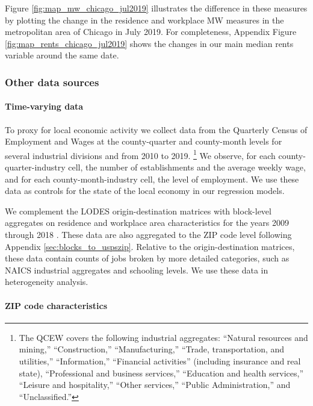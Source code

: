 Figure \ref{fig:map_mw_chicago_jul2019} illustrates the difference in these 
measures by plotting the change in the residence and workplace MW measures 
in the metropolitan area of Chicago in July 2019.
For completeness, Appendix Figure \ref{fig:map_rents_chicago_jul2019} shows
the changes in our main median rents variable around the same date.


\subsubsection{Other data sources}\label{sec:data_other}

\paragraph{Time-varying data}

To proxy for local economic activity we collect data from the 
Quarterly Census of Employment and Wages \parencite[QCEW;][]{QCEW} 
at the county-quarter and county-month levels for several industrial divisions 
and from 2010 to 2019.%
\footnote{The QCEW covers the following industrial aggregates: 
``Natural resources and mining,'' ``Construction,'' ``Manufacturing,'' 
``Trade, transportation, and utilities,'' ``Information,'' 
``Financial activities'' (including insurance and real state), 
``Professional and business services,'' ``Education and health services,'' 
``Leisure and hospitality,'' ``Other services,'' ``Public Administration,''
and ``Unclassified.''}
We observe, for each county-quarter-industry cell, the number of establishments 
and the average weekly wage, and 
for each county-month-industry cell, the level of employment.
We use these data as controls for the state of the local economy in our 
regression models.

We complement the LODES origin-destination matrices with block-level aggregates 
on residence and workplace area characteristics for the years 2009 through 2018 
\parencite{CensusLODES}.
These data are also aggregated to the ZIP code level following Appendix 
\ref{sec:blocks_to_uspszip}.
Relative to the origin-destination matrices, these data contain counts of jobs 
broken by more detailed categories, such as NAICS industrial aggregates and 
schooling levels.
We use these data in heterogeneity analysis.

\paragraph{ZIP code characteristics}

